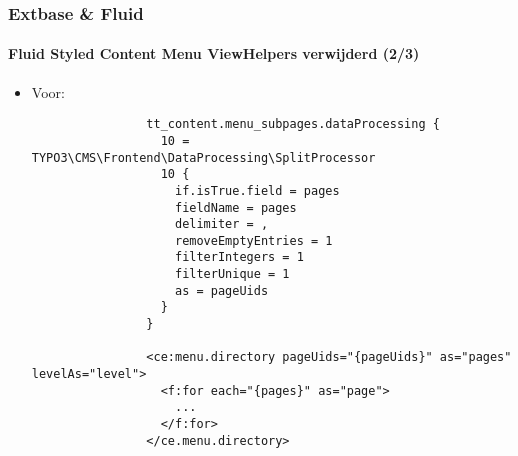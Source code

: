 
\begin{frame}[fragile]
	\frametitle{Extbase \& Fluid}
	\framesubtitle{Fluid Styled Content Menu ViewHelpers verwijderd (2/3)}

	\lstset{basicstyle=\tiny\ttfamily}

	\begin{itemize}

		\item Voor:

			\begin{lstlisting}
				tt_content.menu_subpages.dataProcessing {
				  10 = TYPO3\CMS\Frontend\DataProcessing\SplitProcessor
				  10 {
				    if.isTrue.field = pages
				    fieldName = pages
				    delimiter = ,
				    removeEmptyEntries = 1
				    filterIntegers = 1
				    filterUnique = 1
				    as = pageUids
				  }
				}

				<ce:menu.directory pageUids="{pageUids}" as="pages" levelAs="level">
				  <f:for each="{pages}" as="page">
				    ...
				  </f:for>
				</ce.menu.directory>
			\end{lstlisting}

	\end{itemize}

\end{frame}



